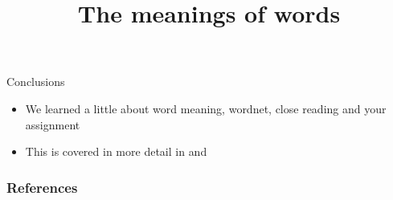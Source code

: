 \documentclass{beamer}
\title[Word Meaning]{The meanings of words}
\begin{document}
\maketitle


%








\begin{frame}{Conclusions}

\begin{itemize}
\item We learned a little about word meaning, wordnet, close reading and your assignment
\item This is covered in more detail in \citet[Chapter 3]{Saeed:2015}  and \citet[Chapter~6 and~7]{Kroeger:2022}
\end{itemize}
\end{frame}



\begin{frame}[allowframebreaks]
  \frametitle{References}
  
  
\end{frame}



\end{document}
